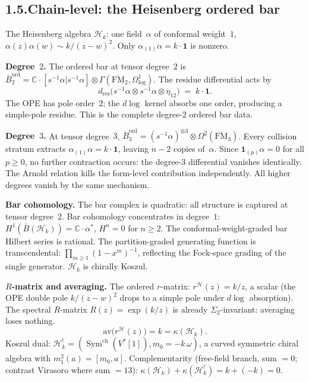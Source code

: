 \documentclass[11pt,reqno]{amsart}
\theoremstyle{definition}
\theoremstyle{remark}
\providecommand{\cH}{\mathcal{H}}
\providecommand{\barB}{\bar{B}}
\providecommand{\bC}{\mathbb{C}}
\numberwithin{equation}{section}
\begin{document}
\subsection*{1.5.\enspace Chain-level: the Heisenberg ordered bar}

The Heisenberg algebra $\cH_k$: one field~$\alpha$ of conformal
weight~$1$, $\alpha(z)\alpha(w)\sim k/(z-w)^2$. Only
$\alpha_{(1)}\alpha=k\cdot\mathbf 1$ is nonzero.

\medskip
\noindent\textbf{Degree~$2$.}\enspace
The ordered bar at tensor degree~$2$ is
$\barB^{\mathrm{ord}}_2=\bC\cdot[s^{-1}\alpha|s^{-1}\alpha]
\otimes\Gamma(\overline{\mathrm{FM}}_2,\Omega^1_{\log})$.
The residue differential acts by
\[
d_{\mathrm{res}}
\bigl(s^{-1}\alpha\otimes s^{-1}\alpha\otimes\eta_{12}\bigr)
\;=\;k\cdot\mathbf{1}.
\]
The OPE has pole order~$2$; the $d\log$ kernel absorbs one order,
producing a simple-pole residue. This is the complete degree-$2$
ordered bar data.

\medskip
\noindent\textbf{Degree~$3$.}\enspace
At tensor degree~$3$,
$\barB^{\mathrm{ord}}_3=(s^{-1}\alpha)^{\otimes 3}
\otimes\Omega^2(\overline{\mathrm{FM}}_3)$.
Every collision stratum extracts
$\alpha_{(1)}\alpha=k\cdot\mathbf{1}$, leaving $n-2$ copies
of~$\alpha$. Since $\mathbf{1}_{(p)}\alpha=0$ for all $p\ge 0$,
no further contraction occurs: the degree-$3$ differential
vanishes identically. The Arnold relation kills the form-level
contribution independently. All higher degrees vanish by the same
mechanism.

\medskip
\noindent\textbf{Bar cohomology.}\enspace
The bar complex is quadratic: all structure is captured at tensor
degree~$2$. Bar cohomology concentrates in degree~$1$:
$H^1(\barB(\cH_k))=\bC\cdot\alpha^*$, $H^n=0$ for $n\ge 2$.
The conformal-weight-graded bar Hilbert series is rational.
The partition-graded generating function is transcendental:
$\prod_{m\ge 1}(1-x^m)^{-1}$, reflecting the Fock-space grading
of the single generator. $\cH_k$ is chirally Koszul.

\medskip
\noindent\textbf{$R$-matrix and averaging.}\enspace
The ordered $r$-matrix: $r^{\cH}(z)=k/z$, a scalar (the OPE double
pole $k/(z-w)^2$ drops to a simple pole under $d\log$ absorption).
The spectral $R$-matrix $R(z)=\exp(k/z)$ is already
$\Sigma_2$-invariant: averaging loses nothing.
\begin{equation}\label{eq:av-heisenberg}
\mathrm{av}\bigl(r^{\cH}(z)\bigr)=k=\kappa(\cH_k).
\end{equation}
Koszul dual:
$\cH_k^!=(\operatorname{Sym}^{\mathrm{ch}}(V^*[1]),m_0=-k\,\omega)$,
a curved symmetric chiral algebra with $m_1^2(a)=[m_0,a]$.
Complementarity (free-field branch, sum $=0$; contrast Virasoro where sum $=13$): $\kappa(\cH_k)+\kappa(\cH_k^!)=k+(-k)=0$.
\end{document}
